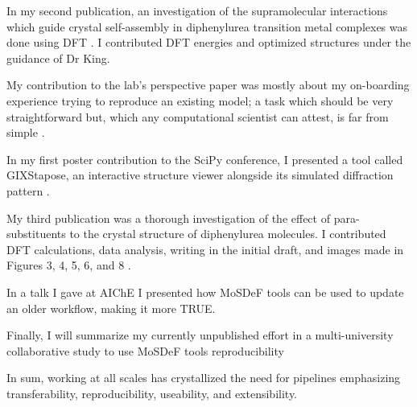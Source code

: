 In my second publication, an investigation of the supramolecular interactions which guide crystal self-assembly in diphenylurea transition metal complexes was done using DFT \cite{Millard2019a}.
I contributed DFT energies and optimized structures under the guidance of Dr King.

My contribution to the lab's perspective paper was mostly about my on-boarding experience trying to reproduce an existing model; a task which should be very straightforward but, which any computational scientist can attest, is far from simple \cite{Jankowski2019}.

In my first poster contribution to the SciPy conference, I presented a tool called GIXStapose, an interactive structure viewer alongside its simulated diffraction pattern \cite{gixstapose, scipy2020}.

My third publication was a thorough investigation of the effect of para-substituents to the crystal structure of diphenylurea molecules. I contributed DFT calculations, data analysis, writing in the initial draft, and images made in Figures 3, 4, 5, 6, and 8 \cite{Fothergill2021}.

In a talk I gave at AIChE I presented how MoSDeF tools can be used to update an older workflow, making it more TRUE.

Finally, I will summarize my currently unpublished effort in a multi-university collaborative study to use MoSDeF tools reproducibility

In sum, working at all scales has crystallized the need for pipelines emphasizing transferability, reproducibility, useability, and extensibility.